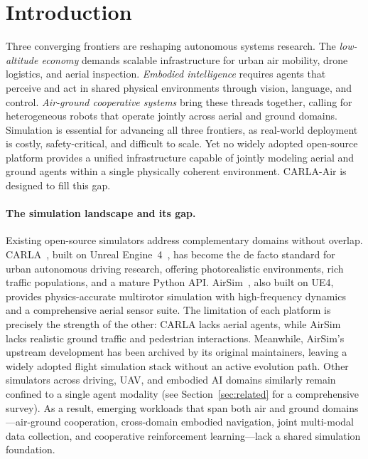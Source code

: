 
\section{Introduction}
\label{sec:introduction}

Three converging frontiers are reshaping autonomous systems research.
The \emph{low-altitude economy} demands scalable infrastructure for urban air
mobility, drone logistics, and aerial inspection.
\emph{Embodied intelligence} requires agents that perceive and act in shared
physical environments through vision, language, and control.
\emph{Air-ground cooperative systems} bring these threads together, calling for
heterogeneous robots that operate jointly across aerial and ground domains.
Simulation is essential for advancing all three frontiers, as real-world
deployment is costly, safety-critical, and difficult to scale.
Yet no widely adopted open-source platform provides a unified infrastructure
capable of jointly modeling aerial and ground agents within a single physically
coherent environment.
CARLA-Air is designed to fill this gap.

\paragraph{The simulation landscape and its gap.}
Existing open-source simulators address complementary domains without overlap.
CARLA~\cite{carla}, built on Unreal Engine~4~\cite{ue4}, has become the de
facto standard for urban autonomous driving research, offering photorealistic
environments, rich traffic populations, and a mature Python API.
AirSim~\cite{airsim}, also built on UE4, provides physics-accurate multirotor
simulation with high-frequency dynamics and a comprehensive aerial sensor suite.
The limitation of each platform is precisely the strength of the other: CARLA
lacks aerial agents, while AirSim lacks realistic ground traffic and pedestrian
interactions.
Meanwhile, AirSim's upstream development has been archived by its original
maintainers, leaving a widely adopted flight simulation stack without an active
evolution path.
Other simulators across driving, UAV, and embodied AI domains similarly remain
confined to a single agent modality (see Section~\ref{sec:related} for a
comprehensive survey).
As a result, emerging workloads that span both air and ground
domains---air-ground cooperation, cross-domain embodied navigation, joint
multi-modal data collection, and cooperative reinforcement learning---lack a
shared simulation foundation.

